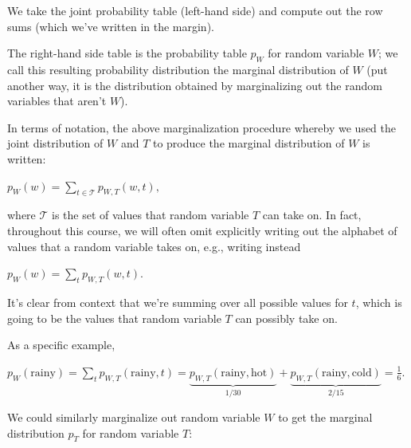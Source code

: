 \documentclass[6008notes.tex]{subfiles}
\begin{document}
We take the joint probability table (left-hand side) and compute out the row sums (which we've written in the margin).

The right-hand side table is the probability table $p_W$ for random variable $W$; we call this resulting probability distribution the marginal distribution of $W$ (put another way, it is the distribution obtained by marginalizing out the random variables that aren't $W$).

In terms of notation, the above marginalization procedure whereby we used the joint distribution of $W$ and $T$ to produce the marginal distribution of $W$ is written:

{\centering$p_{W}(w)=\sum _{t\in \mathcal{T}}p_{W,T}(w,t),$ \par}
 
where $\mathcal{T}$ is the set of values that random variable $T$ can take on. In fact, throughout this course, we will often omit explicitly writing out the alphabet of values that a random variable takes on, e.g., writing instead

{\centering$p_{W}(w)=\sum _{t}p_{W,T}(w,t).$ \par}
 
It's clear from context that we're summing over all possible values for $t$, which is going to be the values that random variable $T$ can possibly take on.

As a specific example,

{\centering$p_{W}(\text {rainy})=\sum _{t}p_{W,T}(\text {rainy},t)=\underbrace{p_{W,T}(\text {rainy},\text {hot})}_{1/30}+\underbrace{p_{W,T}(\text {rainy},\text {cold})}_{2/15}=\frac{1}{6}.$ \par}
 
We could similarly marginalize out random variable $W$ to get the marginal distribution $p_T$ for random variable $T$:
\end{document}
